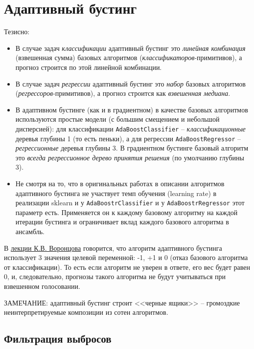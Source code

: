 \documentclass[%
	11pt,
	a4paper,
	utf8,
		]{article}
\begin{document}
\section{Адаптивный бустинг}

Тезисно:
\begin{itemize}
	\item В случае задач \emph{классификации} адаптивный бустинг это \emph{линейная комбинация} (взвешенная сумма) базовых алгоритмов (\emph{классификаторов}-примитивов), а прогноз строится по этой линейной комбинации.
	
	\item В случае задач \emph{регрессии} адаптивный бустинг это \emph{набор} базовых алгоритмов (\emph{регрессоров}-примитивов), а прогноз строится как \emph{взвешенная медиана}.
	
	\item В адаптивном бустинге (как и в градиентном) в качестве базовых алгоритмов используются простые модели (с большим смещением и небольшой дисперсией): для классификации \verb|AdaBoostClassifier| -- \emph{классификационные} деревья глубины 1 (то есть пеньки), а для регрессии \verb|AdaBoostRegressor| -- \emph{регрессионные} деревья глубины 3. В градиентном бустинге базовый алгоритм это \emph{всегда регрессионное дерево принятия решения} (по умолчанию глубины 3).
	
	\item Не смотря на то, что в оригинальных работах в описании алгоритмов адаптивного бустинга не участвует темп обучения (learning rate) в реализации sklearn и у \verb|AdaBoostrClassifier| и у \verb|AdaBoostrRegressor| этот параметр есть. Применяется он к каждому базовому алгоритму на каждой итерации бустинга и ограничивает вклад каждого базового алгоритма в ансамбль.
\end{itemize}

\vspace*{3mm}
В \href{https://www.youtube.com/watch?v=5QrWW_ZlP9w&list=PLJOzdkh8T5krxc4HsHbB8g8f0hu7973fK&index=15}{лекции К.В. Воронцова} говорится, что алгоритм адаптивного бустинга использует 3 значения целевой переменной: -1, +1 и 0 (отказ базового алгоритма от классификации). То есть если алгоритм не уверен в ответе, его вес будет равен 0, и, следовательно, прогнозы такого алгоритма не будут учитываться при взвешенном голосовании.

ЗАМЕЧАНИЕ: адаптивный бустинг строит <<черные ящики>> -- громоздкие неинтерпретируемые композиции из сотен алгоритмов.

\subsection{Фильтрация выбросов}
\end{document}
